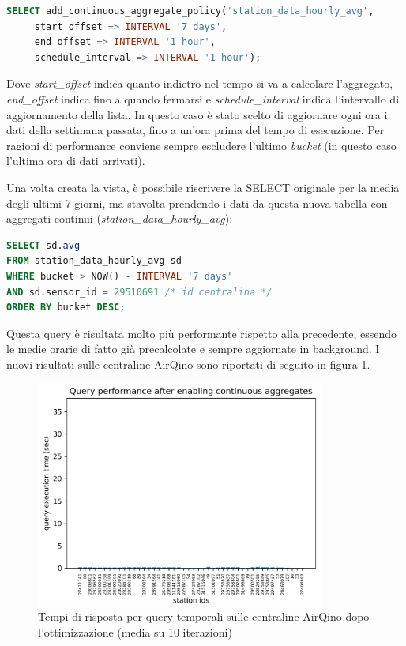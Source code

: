 \begin{enumerate}
\begin{lstlisting}[language=sql]
SELECT add_continuous_aggregate_policy('station_data_hourly_avg',
     start_offset => INTERVAL '7 days',
     end_offset => INTERVAL '1 hour',
     schedule_interval => INTERVAL '1 hour');
\end{lstlisting}
Dove \textit{start\_offset} indica quanto indietro nel tempo si va a calcolare l'aggregato, \textit{end\_offset} indica fino a quando fermarsi e \textit{schedule\_interval} indica l'intervallo di aggiornamento della lista.
In questo caso è stato scelto di aggiornare ogni ora i dati della settimana passata, fino a un'ora prima del tempo di esecuzione.
Per ragioni di performance conviene sempre escludere l'ultimo \textit{bucket} (in questo caso l'ultima ora di dati arrivati). \cite{timescale_ca}
\end{enumerate}

Una volta creata la vista, è possibile riscrivere la SELECT originale per la media degli ultimi 7 giorni, ma stavolta prendendo i dati da questa nuova tabella con aggregati continui (\textit{station\_data\_hourly\_avg}):
\vspace{1mm}
\begin{lstlisting}[language=sql]
SELECT sd.avg
FROM station_data_hourly_avg sd
WHERE bucket > NOW() - INTERVAL '7 days'
AND sd.sensor_id = 29510691 /* id centralina */
ORDER BY bucket DESC;
\end{lstlisting}

Questa query è risultata molto più performante rispetto alla precedente, essendo le medie orarie di fatto già precalcolate e sempre aggiornate in background. I nuovi risultati sulle centraline AirQino sono riportati di seguito in figura \ref{fig:query-dopo}.

\begin{figure}[H]
\centering
\captionsetup{justification=centering}
\includegraphics[width=0.85\textwidth,height=\textheight,keepaspectratio]{img/query_dopo}
\caption{Tempi di risposta per query temporali sulle centraline AirQino dopo l'ottimizzazione (media su 10 iterazioni)}
\label{fig:query-dopo}
\end{figure}

